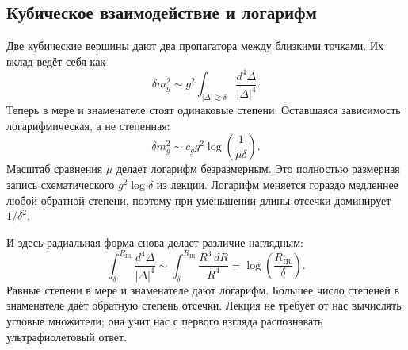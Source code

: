\subsection{Кубическое взаимодействие и логарифм}

Две кубические вершины дают два пропагатора между близкими точками. Их вклад ведёт себя как
\begin{equation}
\delta m_g^2
\sim
g^2\int_{|\Delta|\gtrsim\delta}
\frac{d^4\Delta}{|\Delta|^4}.
\label{eq:cubic-loop}
\end{equation}
Теперь в мере и знаменателе стоят одинаковые степени. Оставшаяся зависимость логарифмическая, а не степенная:
\begin{equation}
\delta m_g^2
\sim
c_g g^2\log\!\left(\frac{1}{\mu\delta}\right).
\label{eq:cubic-log}
\end{equation}
Масштаб сравнения \(\mu\) делает логарифм безразмерным. Это полностью размерная запись схематического \(g^2\log\delta\) из лекции. Логарифм меняется гораздо медленнее любой обратной степени, поэтому при уменьшении длины отсечки доминирует \(1/\delta^2\).

И здесь радиальная форма снова делает различие наглядным:
\begin{equation}
\int_{\delta}^{R_{\mathrm{IR}}}
\frac{d^4\Delta}{|\Delta|^4}
\sim
\int_{\delta}^{R_{\mathrm{IR}}}\frac{R^3\,dR}{R^4}
=\log\!\left(\frac{R_{\mathrm{IR}}}{\delta}\right).
\end{equation}
Равные степени в мере и знаменателе дают логарифм. Большее число степеней в знаменателе даёт обратную степень отсечки. Лекция не требует от нас вычислять угловые множители; она учит нас с первого взгляда распознавать ультрафиолетовый ответ.

\begin{classroomqa}
\end{classroomqa}

\begin{classroomqa}
\end{classroomqa}

